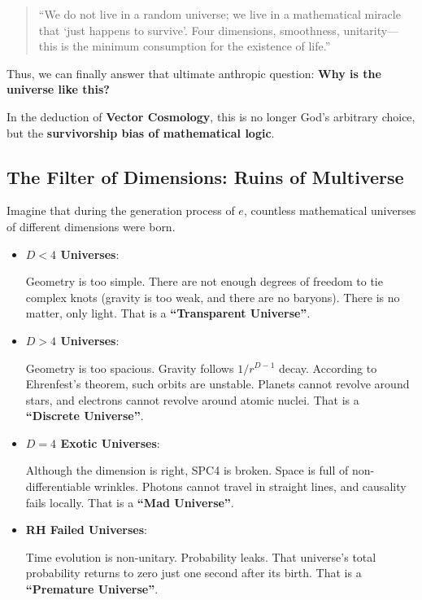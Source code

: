 \begin{quote}
``We do not live in a random universe; we live in a mathematical miracle that `just happens to survive'. Four dimensions, smoothness, unitarity—this is the minimum consumption for the existence of life.''
\end{quote}

Thus, we can finally answer that ultimate anthropic question: \textbf{Why is the universe like this?}

In the deduction of \textbf{Vector Cosmology}, this is no longer God's arbitrary choice, but the \textbf{survivorship bias of mathematical logic}.

\subsection{The Filter of Dimensions: Ruins of Multiverse}

Imagine that during the generation process of $e$, countless mathematical universes of different dimensions were born.

\begin{itemize}
\item \textbf{$D < 4$ Universes}:

    Geometry is too simple. There are not enough degrees of freedom to tie complex knots (gravity is too weak, and there are no baryons). There is no matter, only light. That is a \textbf{``Transparent Universe''}.

\item \textbf{$D > 4$ Universes}:

    Geometry is too spacious. Gravity follows $1/r^{D-1}$ decay. According to Ehrenfest's theorem, such orbits are unstable. Planets cannot revolve around stars, and electrons cannot revolve around atomic nuclei. That is a \textbf{``Discrete Universe''}.

\item \textbf{$D = 4$ Exotic Universes}:

    Although the dimension is right, SPC4 is broken. Space is full of non-differentiable wrinkles. Photons cannot travel in straight lines, and causality fails locally. That is a \textbf{``Mad Universe''}.

\item \textbf{RH Failed Universes}:

    Time evolution is non-unitary. Probability leaks. That universe's total probability returns to zero just one second after its birth. That is a \textbf{``Premature Universe''}.
\end{itemize}

